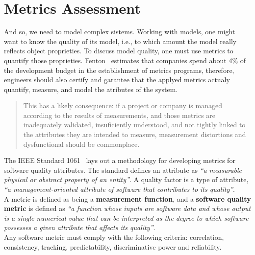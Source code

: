 \section{Metrics Assessment} \label{assess}
\begin{comment}
Effective management of any process requires quantification, measurement, and modeling.
Software metrics provide a quantitative basis for the development and validation of models of the software development process.
Metrics can be used to improve software productivity and quality\cite{g1:Millis:1998}.
\end{comment}
And so, we need to model complex sistems. Working with models, one might want to know the quality of its model, i.e., to which amount the model
really reflects object proprieties. To discuss model quality, one must use metrics to quantify those proprieties. Fenton~\cite{g1:Fenton:1999} estimates that
companies spend about 4\% of the development budget in the establishment of metrics programs, therefore, engineers
should also certify and garantee that the applyed metrics actualy quantify, measure, and model the atributes of the system.
\begin{quotation}
	This has a likely consequence: if a project or company is managed according to the results of measurements, and those metrics are inadequately validated, insuficiently understood, and not tightly linked to the attributes they are intended to measure, measurement distortions and dysfunctional should be commonplace\cite{g1:kaner:2004}.
\end{quotation}
The IEEE Standard 1061~\cite{g1:Ieee1061:1998} lays out a methodology for developing metrics for software quality attributes.
The standard defines an attribute as \emph{``a measurable physical or abstract property of an entity''}. A quality factor is a type of attribute,
\emph{``a management-oriented attribute of software that contributes to its quality''}.\\
A metric is defined as being a {\bf measurement function}, and a {\bf software quality metric} is defined
as \emph{``a function whose inputs are software data and whose output is a single numerical value that can be interpreted as the degree to
which software possesses a given attribute that affects its quality''}.\\
Any software metric must comply with the following criteria: correlation, consistency, tracking, predictability, discriminative power and reliability.

